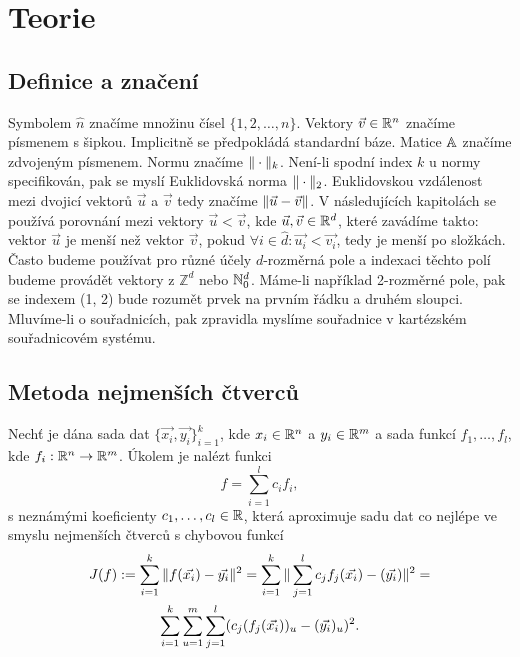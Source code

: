 \chapter{Teorie}

\section{Definice a značení}

Symbolem $\hat n$ značíme množinu čísel $\{1, 2, \ldots, n\}$. Vektory $\vec{v} \in \mathbb{R}^n$ značíme písmenem s šipkou. Implicitně se předpokládá standardní báze. Matice $\mathbb{A}$ značíme zdvojeným písmenem. Normu značíme $\|\cdot\|_k$. Není-li spodní index $k$ u normy specifikován, pak se myslí Euklidovská norma $\|\cdot\|_2$. Euklidovskou vzdálenost mezi dvojicí vektorů $\vec{u}$ a $\vec{v}$ tedy značíme $\|\vec{u} - \vec{v}\|$. V následujících kapitolách se používá porovnání mezi vektory $\vec{u} < \vec{v}$, kde $\vec{u}, \vec{v} \in \mathbb{R}^d$, které zavádíme takto: vektor $\vec{u}$ je menší než vektor $\vec{v}$, pokud $\forall i \in \hat{d}: \vec{u_i} < \vec{v_i}$, tedy je menší po složkách. Často budeme používat pro různé účely $d$-rozměrná pole a indexaci těchto polí budeme provádět vektory z $\mathbb{Z}^d$ nebo $\mathbb{N}_0^d$. Máme-li například 2-rozměrné pole, pak se indexem (1, 2) bude rozumět prvek na prvním řádku a druhém sloupci. Mluvíme-li o souřadnicích, pak zpravidla myslíme souřadnice v kartézském souřadnicovém systému.

\section{Metoda nejmenších čtverců}

Nechť je dána sada dat $\{\vec{x_i}, \vec{y_i}\}_{i = 1}^k$, kde $x_i \in \mathbb{R}^n$ a $y_i \in \mathbb{R}^m$ a sada funkcí $f_1,\ldots,f_l$, kde $f_i: \mathbb{R}^n \rightarrow \mathbb{R}^m$. Úkolem je nalézt funkci
\[
  f = \sum_{i=1}^l c_if_i,
\]
s neznámými koeficienty $c_1,\ldots,c_l \in \mathbb{R}$, která aproximuje sadu dat co nejlépe ve smyslu nejmenších čtverců s chybovou funkcí
\begin{multline}
\label{defi:ls-min}
  J(f) := \sum_{i=1}^k \|f(\vec{x_i}) - \vec{y_i}\|^2 =
  \sum_{i=1}^k\|\sum_{j=1}^l c_jf_j(\vec{x_i}) - (\vec{y_i})\|^2 =\\
  \sum_{i=1}^k\sum_{u=1}^m\sum_{j=1}^l (c_j(f_j(\vec{x_i}))_u - (\vec{y_i})_u)^2.\\
\end{multline}

